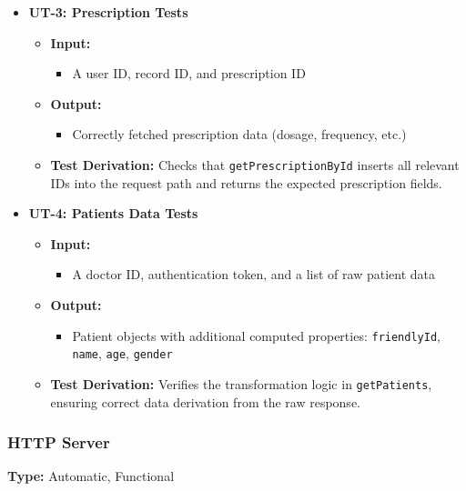 \documentclass[12pt, titlepage]{article}
\begin{document}
\begin{itemize}
    \item \textbf{UT-3: Prescription Tests} \label{test:frontend-prescription}
    \begin{itemize}
        \item \textbf{Input:} 
        \begin{itemize}
          \item A user ID, record ID, and prescription ID
        \end{itemize}
        \item \textbf{Output:} 
        \begin{itemize}
          \item Correctly fetched prescription data (dosage, frequency, etc.)
        \end{itemize}
        \item \textbf{Test Derivation:}  
        Checks that \texttt{getPrescriptionById} inserts all relevant IDs into the request path and returns the expected prescription fields.
    \end{itemize}

    \item \textbf{UT-4: Patients Data Tests} \label{test:frontend-patients}
    \begin{itemize}
        \item \textbf{Input:} 
        \begin{itemize}
          \item A doctor ID, authentication token, and a list of raw patient data
        \end{itemize}
        \item \textbf{Output:} 
        \begin{itemize}
          \item Patient objects with additional computed properties: \texttt{friendlyId}, \texttt{name}, \texttt{age}, \texttt{gender}
        \end{itemize}
        \item \textbf{Test Derivation:}  
        Verifies the transformation logic in \texttt{getPatients}, ensuring correct data derivation from the raw response.
    \end{itemize}
\end{itemize}


\subsubsection{HTTP Server}

\textbf{Type:} Automatic, Functional
\vspace{10pt}
\end{document}
